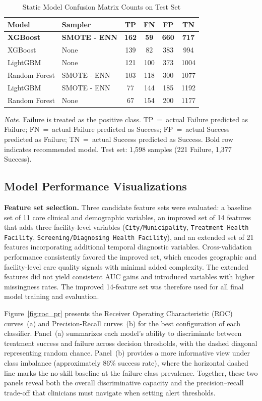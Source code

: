 \documentclass[12pt]{article}
\begin{document}
\begin{table}[htbp]
\caption{Static Model Confusion Matrix Counts on Test Set}
\label{tab:static_confusion_matrix}
\small
\begin{tabular}{llcccc}
\toprule
Model & Sampler & TP & FN & FP & TN \\
\midrule
\textbf{XGBoost} & \textbf{SMOTE - ENN} & \textbf{162} & \textbf{59} & \textbf{660} & \textbf{717} \\
XGBoost & None & 139 & 82 & 383 & 994 \\
LightGBM & None & 121 & 100 & 373 & 1004 \\
Random Forest & SMOTE - ENN & 103 & 118 & 300 & 1077 \\
LightGBM & SMOTE - ENN & 77 & 144 & 185 & 1192 \\
Random Forest & None & 67 & 154 & 200 & 1177 \\
\bottomrule
\end{tabular}

{\footnotesize \textit{Note.} Failure is treated as the positive class. TP~=~actual Failure predicted as Failure; FN~=~actual Failure predicted as Success; FP~=~actual Success predicted as Failure; TN~=~actual Success predicted as Success. Bold row indicates recommended model. Test set: 1{,}598 samples (221 Failure, 1{,}377 Success).}
\end{table}


\subsection{Model Performance Visualizations}

\textbf{Feature set selection.} Three candidate feature sets were evaluated: a baseline set of 11 core clinical and demographic variables, an improved set of 14 features that adds three facility-level variables (\texttt{City/Municipality}, \texttt{Treatment Health Facility}, \texttt{Screening/Diagnosing Health Facility}), and an extended set of 21 features incorporating additional temporal diagnostic variables. Cross-validation performance consistently favored the improved set, which encodes geographic and facility-level care quality signals with minimal added complexity. The extended features did not yield consistent AUC gains and introduced variables with higher missingness rates. The improved 14-feature set was therefore used for all final model training and evaluation.

Figure~\ref{fig:roc_pr} presents the Receiver Operating Characteristic (ROC) curves~(a) and Precision-Recall curves~(b) for the best configuration of each classifier. Panel~(a) summarizes each model's ability to discriminate between treatment success and failure across decision thresholds, with the dashed diagonal representing random chance. Panel~(b) provides a more informative view under class imbalance (approximately 86\% success rate), where the horizontal dashed line marks the no-skill baseline at the failure class prevalence. Together, these two panels reveal both the overall discriminative capacity and the precision--recall trade-off that clinicians must navigate when setting alert thresholds.
\end{document}
